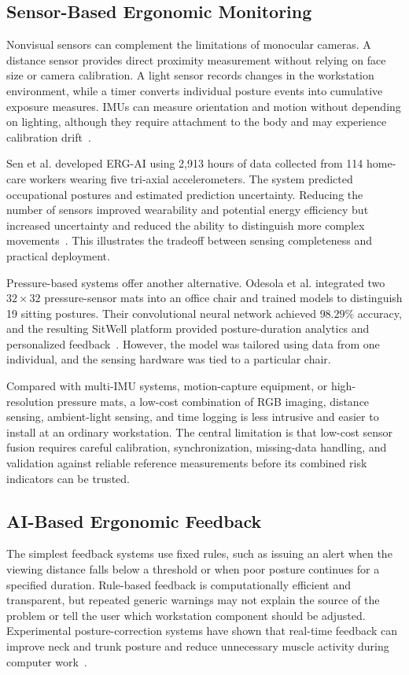 \subsection{Sensor-Based Ergonomic Monitoring}
Nonvisual sensors can complement the limitations of monocular cameras. A distance sensor provides direct proximity measurement without relying on face size or camera calibration. A light sensor records changes in the workstation environment, while a timer converts individual posture events into cumulative exposure measures. IMUs can measure orientation and motion without depending on lighting, although they require attachment to the body and may experience calibration drift~\cite{ref13}.

Sen et al. developed ERG-AI using 2,913 hours of data collected from 114 home-care workers wearing five tri-axial accelerometers. The system predicted occupational postures and estimated prediction uncertainty. Reducing the number of sensors improved wearability and potential energy efficiency but increased uncertainty and reduced the ability to distinguish more complex movements~\cite{ref14}. This illustrates the tradeoff between sensing completeness and practical deployment.

Pressure-based systems offer another alternative. Odesola et al. integrated two $32 \times 32$ pressure-sensor mats into an office chair and trained models to distinguish 19 sitting postures. Their convolutional neural network achieved $98.29\%$ accuracy, and the resulting SitWell platform provided posture-duration analytics and personalized feedback~\cite{ref15}. However, the model was tailored using data from one individual, and the sensing hardware was tied to a particular chair.

Compared with multi-IMU systems, motion-capture equipment, or high-resolution pressure mats, a low-cost combination of RGB imaging, distance sensing, ambient-light sensing, and time logging is less intrusive and easier to install at an ordinary workstation. The central limitation is that low-cost sensor fusion requires careful calibration, synchronization, missing-data handling, and validation against reliable reference measurements before its combined risk indicators can be trusted.

\subsection{AI-Based Ergonomic Feedback}
The simplest feedback systems use fixed rules, such as issuing an alert when the viewing distance falls below a threshold or when poor posture continues for a specified duration. Rule-based feedback is computationally efficient and transparent, but repeated generic warnings may not explain the source of the problem or tell the user which workstation component should be adjusted. Experimental posture-correction systems have shown that real-time feedback can improve neck and trunk posture and reduce unnecessary muscle activity during computer work~\cite{ref25}.

